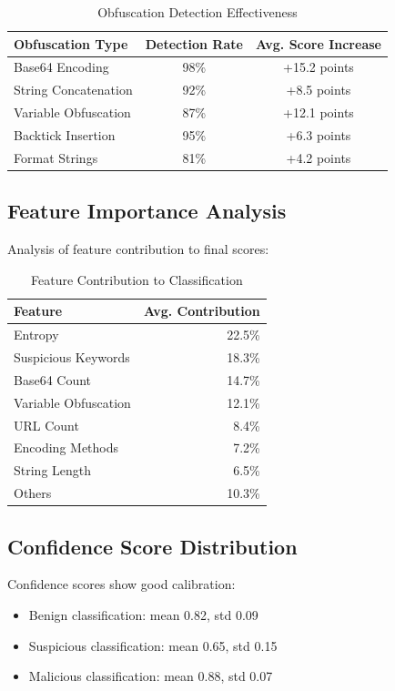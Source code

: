 \documentclass[10pt,conference,a4paper]{IEEEtran}
\begin{document}
\begin{table}[H]
\centering
\small
\begin{tabular}{|l|c|c|}
\hline
\textbf{Obfuscation Type} & \textbf{Detection Rate} & \textbf{Avg. Score Increase} \\
\hline
Base64 Encoding & 98\% & +15.2 points \\
String Concatenation & 92\% & +8.5 points \\
Variable Obfuscation & 87\% & +12.1 points \\
Backtick Insertion & 95\% & +6.3 points \\
Format Strings & 81\% & +4.2 points \\
\hline
\end{tabular}
\caption{Obfuscation Detection Effectiveness}
\label{tab:obfuscation}
\end{table}

\subsection{Feature Importance Analysis}

Analysis of feature contribution to final scores:

\begin{table}[H]
\centering
\small
\begin{tabular}{|l|r|}
\hline
\textbf{Feature} & \textbf{Avg. Contribution} \\
\hline
Entropy & 22.5\% \\
Suspicious Keywords & 18.3\% \\
Base64 Count & 14.7\% \\
Variable Obfuscation & 12.1\% \\
URL Count & 8.4\% \\
Encoding Methods & 7.2\% \\
String Length & 6.5\% \\
Others & 10.3\% \\
\hline
\end{tabular}
\caption{Feature Contribution to Classification}
\label{tab:features_importance}
\end{table}

\subsection{Confidence Score Distribution}

Confidence scores show good calibration:

\begin{itemize}
\item Benign classification: mean 0.82, std 0.09
\item Suspicious classification: mean 0.65, std 0.15
\item Malicious classification: mean 0.88, std 0.07
\end{itemize}
\end{document}
